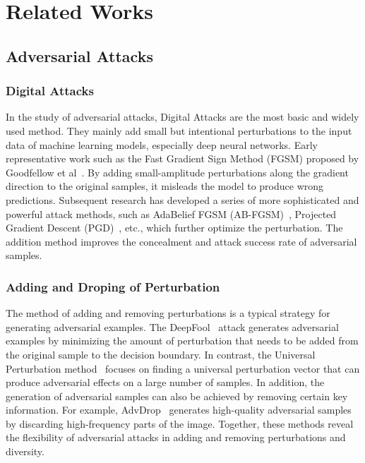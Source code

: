 \section{Related Works}
\subsection{Adversarial Attacks}

\subsubsection{Digital Attacks}

In the study of adversarial attacks, Digital Attacks are the most basic and widely used method. They mainly add small but intentional perturbations to the input data of machine learning models, especially deep neural networks. Early representative work such as the Fast Gradient Sign Method (FGSM) proposed by Goodfellow et al~\cite{goodfellow2014explaining}. By adding small-amplitude perturbations along the gradient direction to the original samples, it misleads the model to produce wrong predictions. Subsequent research has developed a series of more sophisticated and powerful attack methods, such as AdaBelief FGSM (AB-FGSM)~\cite{wang2022ab}, Projected Gradient Descent (PGD)~\cite{gupta2018cnn}, etc., which further optimize the perturbation. The addition method improves the concealment and attack success rate of adversarial samples.

\subsubsection{Adding and Droping of Perturbation}

The method of adding and removing perturbations is a typical strategy for generating adversarial examples. The DeepFool~\cite{moosavi2016deepfool} attack generates adversarial examples by minimizing the amount of perturbation that needs to be added from the original sample to the decision boundary. In contrast, the Universal Perturbation method~\cite{moosavi2017universal} focuses on finding a universal perturbation vector that can produce adversarial effects on a large number of samples. In addition, the generation of adversarial samples can also be achieved by removing certain key information. For example, AdvDrop~\cite{duan2021advdrop} generates high-quality adversarial samples by discarding high-frequency parts of the image. Together, these methods reveal the flexibility of adversarial attacks in adding and removing perturbations and diversity.

